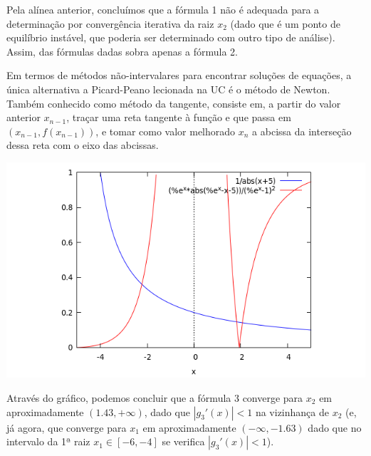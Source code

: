 Pela alínea anterior, concluímos que a fórmula 1 não é adequada para a determinação por convergência iterativa da raiz $x_2$ (dado que é um ponto de equilíbrio instável, que poderia ser determinado com outro tipo de análise). Assim, das fórmulas dadas sobra apenas a fórmula 2.\par
Em termos de métodos não-intervalares para encontrar soluções de equações, a única alternativa a Picard-Peano lecionada na UC é o método de Newton. Também conhecido como método da tangente, consiste em, a partir do valor anterior $x_{n-1}$, traçar uma reta tangente à função e que passa em $(x_{n-1}, f(x_{n-1}))$, e tomar como valor melhorado $x_n$ a abcissa da interseção dessa reta com o eixo das abcissas.

\begin{center} \includegraphics[scale=0.5]{2017E_3_3} \end{center}
Através do gráfico, podemos concluir que a fórmula 3 converge para $x_2$ em aproximadamente $(1.43, +\infty)$, dado que $|g_3'(x)|<1$ na vizinhança de $x_2$ (e, já agora, que converge para $x_1$ em aproximadamente $(-\infty, -1.63)$ dado que no intervalo da 1ª raiz $x_1 \in [-6,-4]$ se verifica $|g_3'(x)|<1$).
